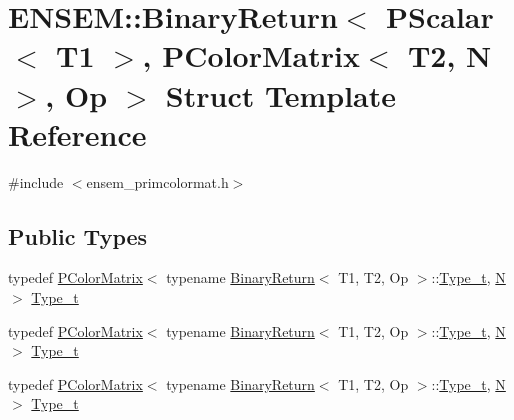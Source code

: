 \hypertarget{structENSEM_1_1BinaryReturn_3_01PScalar_3_01T1_01_4_00_01PColorMatrix_3_01T2_00_01N_01_4_00_01Op_01_4}{}\section{E\+N\+S\+EM\+:\+:Binary\+Return$<$ P\+Scalar$<$ T1 $>$, P\+Color\+Matrix$<$ T2, N $>$, Op $>$ Struct Template Reference}
\label{structENSEM_1_1BinaryReturn_3_01PScalar_3_01T1_01_4_00_01PColorMatrix_3_01T2_00_01N_01_4_00_01Op_01_4}


{\ttfamily \#include $<$ensem\+\_\+primcolormat.\+h$>$}

\subsection*{Public Types}
\begin{DoxyCompactItemize}
\item 
typedef \mbox{\hyperlink{classENSEM_1_1PColorMatrix}{P\+Color\+Matrix}}$<$ typename \mbox{\hyperlink{structENSEM_1_1BinaryReturn}{Binary\+Return}}$<$ T1, T2, Op $>$\+::\mbox{\hyperlink{structENSEM_1_1BinaryReturn_3_01PScalar_3_01T1_01_4_00_01PColorMatrix_3_01T2_00_01N_01_4_00_01Op_01_4_a97b44a952bd9e0913c09d9be8de65a5e}{Type\+\_\+t}}, \mbox{\hyperlink{adat__devel_2lib_2hadron_2operator__name__util_8cc_a7722c8ecbb62d99aee7ce68b1752f337}{N}} $>$ \mbox{\hyperlink{structENSEM_1_1BinaryReturn_3_01PScalar_3_01T1_01_4_00_01PColorMatrix_3_01T2_00_01N_01_4_00_01Op_01_4_a97b44a952bd9e0913c09d9be8de65a5e}{Type\+\_\+t}}
\item 
typedef \mbox{\hyperlink{classENSEM_1_1PColorMatrix}{P\+Color\+Matrix}}$<$ typename \mbox{\hyperlink{structENSEM_1_1BinaryReturn}{Binary\+Return}}$<$ T1, T2, Op $>$\+::\mbox{\hyperlink{structENSEM_1_1BinaryReturn_3_01PScalar_3_01T1_01_4_00_01PColorMatrix_3_01T2_00_01N_01_4_00_01Op_01_4_a97b44a952bd9e0913c09d9be8de65a5e}{Type\+\_\+t}}, \mbox{\hyperlink{adat__devel_2lib_2hadron_2operator__name__util_8cc_a7722c8ecbb62d99aee7ce68b1752f337}{N}} $>$ \mbox{\hyperlink{structENSEM_1_1BinaryReturn_3_01PScalar_3_01T1_01_4_00_01PColorMatrix_3_01T2_00_01N_01_4_00_01Op_01_4_a97b44a952bd9e0913c09d9be8de65a5e}{Type\+\_\+t}}
\item 
typedef \mbox{\hyperlink{classENSEM_1_1PColorMatrix}{P\+Color\+Matrix}}$<$ typename \mbox{\hyperlink{structENSEM_1_1BinaryReturn}{Binary\+Return}}$<$ T1, T2, Op $>$\+::\mbox{\hyperlink{structENSEM_1_1BinaryReturn_3_01PScalar_3_01T1_01_4_00_01PColorMatrix_3_01T2_00_01N_01_4_00_01Op_01_4_a97b44a952bd9e0913c09d9be8de65a5e}{Type\+\_\+t}}, \mbox{\hyperlink{adat__devel_2lib_2hadron_2operator__name__util_8cc_a7722c8ecbb62d99aee7ce68b1752f337}{N}} $>$ \mbox{\hyperlink{structENSEM_1_1BinaryReturn_3_01PScalar_3_01T1_01_4_00_01PColorMatrix_3_01T2_00_01N_01_4_00_01Op_01_4_a97b44a952bd9e0913c09d9be8de65a5e}{Type\+\_\+t}}
\end{DoxyCompactItemize}


